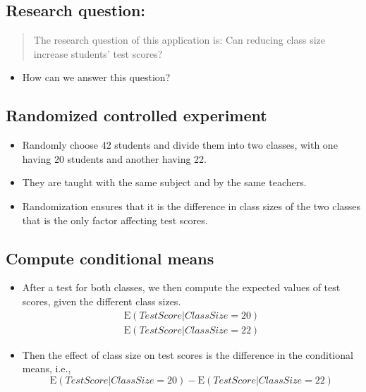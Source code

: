 \documentclass[11pt]{article}
\begin{document}
\subsection*{Research question:}
\label{sec:orgc1f473a}

\begin{quote}
The research question of this application is: Can reducing class size
increase students' test scores?
\end{quote}

\begin{itemize}
\item How can we answer this question?
\end{itemize}

\subsection*{Randomized controlled experiment}
\label{sec:org1a0b4fe}

\begin{itemize}
\item Randomly choose 42 students and divide them into two classes,
with one having 20 students and another having 22.
\item They are
taught with the same subject and by the same teachers.
\item Randomization ensures that it is the difference in class sizes of
the two classes that is the only factor affecting test scores.
\end{itemize}

\subsection*{Compute conditional means}
\label{sec:org14dd650}

\begin{itemize}
\item After a test for both classes, we then compute the expected values
of test scores, given the different class sizes.
\begin{gather*}
\mathrm{E}(TestScore | ClassSize = 20) \\
\mathrm{E}(TestScore | ClassSize = 22)
\end{gather*}

\item Then the effect of class size on test scores is the difference in
the conditional means, i.e.,
\begin{equation*}
\mathrm{E}(TestScore | ClassSize = 20) - \mathrm{E}(TestScore | ClassSize = 22)
\end{equation*}
\end{itemize}
\end{document}
